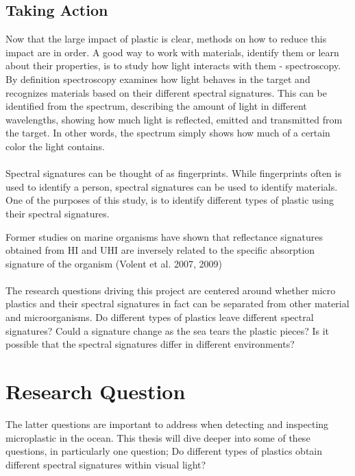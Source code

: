 \subsection{Taking Action}
Now that the large impact of plastic is clear, methods on how to reduce this impact are in order. A good way to work with materials, identify them or learn about their properties, is to study how light interacts with them - spectroscopy. By definition spectroscopy examines how light behaves in the target and recognizes materials based on their different spectral signatures. This can be identified from the spectrum, describing the amount of light in different wavelengths, showing how much light is reflected, emitted and transmitted from the target. In other words, the spectrum simply shows how much of a certain color the light contains. 
\\\\
Spectral signatures can be thought of as fingerprints. While fingerprints often is used to identify a person, spectral signatures can be used to identify materials. One of the purposes of this study, is to identify different types of plastic using their spectral signatures. %

Former studies on marine organisms have shown that reflectance signatures obtained from HI and UHI are inversely related to the specific absorption signature of the organism (Volent et al. 2007, 2009)
\\\\
The research questions driving this project are centered around whether micro plastics and their spectral signatures in fact can be separated from other material and microorganisms. Do different types of plastics leave different spectral signatures? Could a signature change as the sea tears the plastic pieces? Is it possible that the spectral signatures differ in different environments?

\section{Research Question}
The latter questions are important to address when detecting and inspecting microplastic in the ocean. This thesis will dive deeper into some of these questions, in particularly one question; Do different types of plastics obtain different spectral signatures within visual light?

